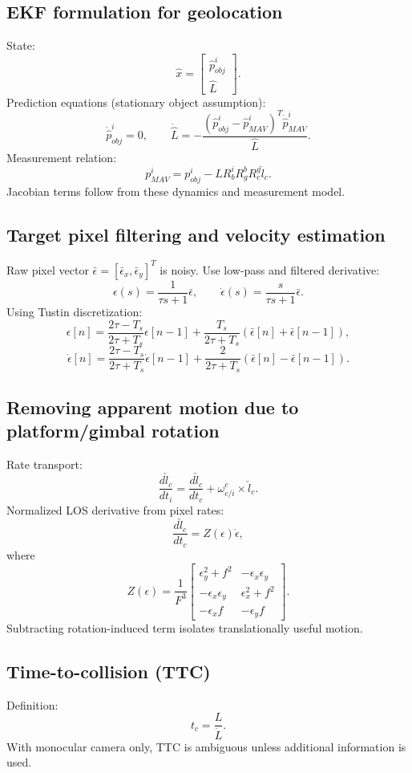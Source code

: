 \documentclass[11pt,a4paper]{article}
\begin{document}
\subsection{EKF formulation for geolocation}
State:
\[
\hat x=\begin{bmatrix}\hat p_{obj}^i\\ \hat L\end{bmatrix}.
\]
Prediction equations (stationary object assumption):
\[
\dot{\hat p}_{obj}^i=0,\qquad
\dot{\hat L}
=-\frac{(\hat p_{obj}^i-\hat p_{MAV}^i)^T\dot{\hat p}_{MAV}^i}{\hat L}.
\]
Measurement relation:
\[
p_{MAV}^i=p_{obj}^i-LR_b^iR_g^bR_c^g\check l_c.
\]
Jacobian terms follow from these dynamics and measurement model.

\subsection{Target pixel filtering and velocity estimation}
Raw pixel vector $\bar\epsilon=[\bar\epsilon_x,\bar\epsilon_y]^T$ is noisy.
Use low-pass and filtered derivative:
\[
\epsilon(s)=\frac{1}{\tau s+1}\bar\epsilon,\qquad
\dot\epsilon(s)=\frac{s}{\tau s+1}\bar\epsilon.
\]
Using Tustin discretization:
\[
\epsilon[n]=\frac{2\tau-T_s}{2\tau+T_s}\epsilon[n-1]
+\frac{T_s}{2\tau+T_s}\left(\bar\epsilon[n]+\bar\epsilon[n-1]\right),
\]
\[
\dot\epsilon[n]=\frac{2\tau-T_s}{2\tau+T_s}\dot\epsilon[n-1]
+\frac{2}{2\tau+T_s}\left(\bar\epsilon[n]-\bar\epsilon[n-1]\right).
\]

\subsection{Removing apparent motion due to platform/gimbal rotation}
Rate transport:
\[
\frac{d\check l_c}{dt_i}
=\frac{d\check l_c}{dt_c}+\omega_{c/i}^c\times \check l_c.
\]
Normalized LOS derivative from pixel rates:
\[
\frac{d\check l_c}{dt_c}=Z(\epsilon)\dot\epsilon,
\]
where
\[
Z(\epsilon)=\frac{1}{F^3}
\begin{bmatrix}
\epsilon_y^2+f^2 & -\epsilon_x\epsilon_y\\
-\epsilon_x\epsilon_y & \epsilon_x^2+f^2\\
-\epsilon_x f & -\epsilon_y f
\end{bmatrix}.
\]
Subtracting rotation-induced term isolates translationally useful motion.

\subsection{Time-to-collision (TTC)}
Definition:
\[
t_c=\frac{L}{\dot L}.
\]
With monocular camera only, TTC is ambiguous unless additional information is used.
\end{document}
